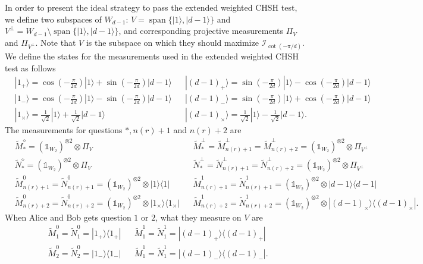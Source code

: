 \documentclass[11pt,letterpaper]{article}
\newcommand{\ket}[1]{|#1\rangle}
\newcommand{\ketbra}[2]{|#1\rangle\langle#2|}
\newcommand{\x}{\otimes}
\DeclareMathOperator{\spn}{span}
\newcommand{\1}{\mathbb{1}}
\newcommand{\tM}{\tilde{M}}
\newcommand{\tN}{\tilde{N}}
\newcommand{\nr}{n(r)}
\newcommand{\I}{\mathcal{I}}
\theoremstyle{definition}
\begin{document}
In order to present the ideal strategy to pass the extended weighted CHSH test,
we define two subspaces of $W_{d-1}$: $V = \spn\{\ket{1}, \ket{d-1}\}$ and $V^\perp = W_{d-1} \setminus\spn\{\ket{1}, \ket{d-1}\}$,
and corresponding projective measurements $\Pi_V$ and $\Pi_{V^\perp}$. Note that $V$ is the subspace on which they should maximize $\I_{\cot(-\pi/d)}$.
We define the states for the measurements used in the extended weighted CHSH test as follows
\begin{align*}
	&\ket{1_+} = \cos(-\frac{\pi}{2d})\ket{1} + \sin(-\frac{\pi}{2d})\ket{d-1}
	&&\ket{(d-1)_+} = \sin(-\frac{\pi}{2d})\ket{1} - \cos(-\frac{\pi}{2d})\ket{d-1}\\
	&\ket{1_-} = \cos(-\frac{\pi}{2d})\ket{1} - \sin(-\frac{\pi}{2d})\ket{d-1}
	&&\ket{(d-1)_-} = \sin(-\frac{\pi}{2d})\ket{1} + \cos(-\frac{\pi}{2d})\ket{d-1}\\
	&\ket{1_{\times}} = \frac{1}{\sqrt{2}}\ket{1} + \frac{1}{\sqrt{2}}\ket{d-1}
	&&\ket{(d-1)_{\times}} = \frac{1}{\sqrt{2}}\ket{1} - \frac{1}{\sqrt{2}}\ket{d-1}.
\end{align*}
The measurements for questions $\ast, \nr+1$ and $\nr+2$ are
\begin{align*}
	&\tM_\ast^\diamond =(\1_{W_2})^{\x 2} \x \Pi_V && \tM_\ast^\perp = \tM_{\nr+1}^\perp = \tM_{\nr+2}^\perp = (\1_{W_2})^{\x 2} \x \Pi_{V^\perp}\\
	&\tN_\ast^\diamond = (\1_{W_2})^{\x 2} \x \Pi_V && \tN_\ast^\perp = \tN_{\nr+1}^\perp = \tN_{\nr+2}^\perp = (\1_{W_2})^{\x 2} \x \Pi_{V^\perp}\\
	&\tM_{\nr+1}^0 =\tN_{\nr+1}^0=(\1_{W_2})^{\x 2} \x  \ketbra{1}{1} && \tM_{\nr+1}^1=\tN_{\nr+1}^1 = (\1_{W_2})^{\x 2} \x \ketbra{d-1}{d-1}\\
	&\tM_{\nr+2}^0 =\tN_{\nr+2}^0=(\1_{W_2})^{\x 2} \x  \ketbra{1_{\times}}{1_{\times}} && \tM_{\nr+2}^1= \tN_{\nr+2}^1 = (\1_{W_2})^{\x 2} \x \ketbra{(d-1)_{\times}}{(d-1)_{\times}}.
\end{align*}
When Alice and Bob gets question $1$ or $2$, what they measure on $V$ are
\begin{align*}
	&\tM_1^0 = \tN_1^0 =  \ketbra{1_+}{1_+} && \tM_1^1 = \tN_1^1 =  \ketbra{(d-1)_+}{(d-1)_+}\\
	&\tM_2^0 = \tN_2^0 =  \ketbra{1_-}{1_-} && \tM_1^1 = \tN_1^1 =  \ketbra{(d-1)_-}{(d-1)_-}.
\end{align*}
\end{document}
